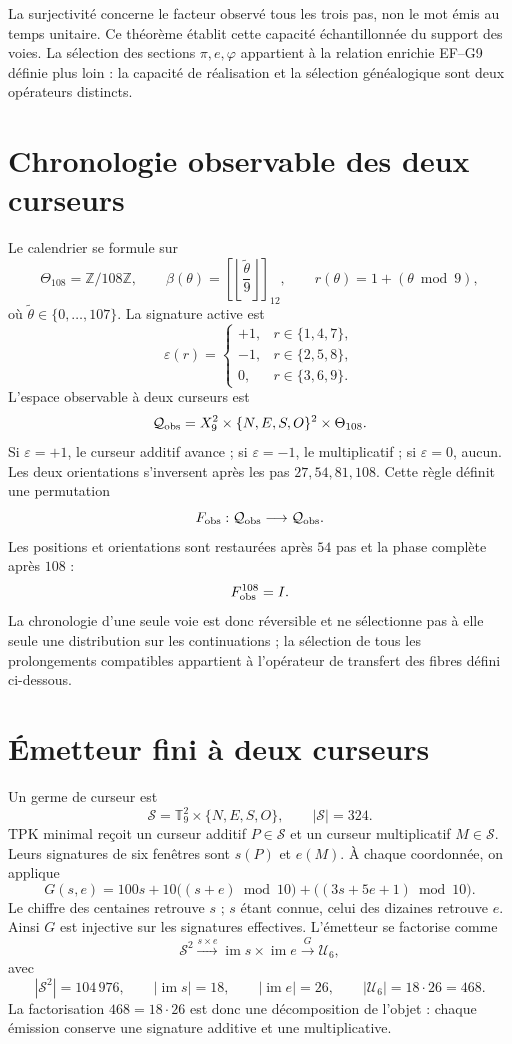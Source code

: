 La surjectivité concerne le facteur observé tous les trois pas, non le
mot émis au temps unitaire. Ce théorème établit cette capacité
échantillonnée du support des voies. La sélection des sections
\(\pi,e,\varphi\) appartient à la relation enrichie EF--G9 définie
plus loin : la capacité de réalisation et la sélection généalogique sont deux
opérateurs distincts.

\section{Chronologie observable des deux curseurs}

Le calendrier se formule sur
\[
 \Theta_{108}=\mathbb Z/108\mathbb Z,\qquad
 \beta(\theta)=
 \left[\left\lfloor\frac{\widetilde\theta}{9}\right\rfloor\right]_{12},
 \qquad
 r(\theta)=1+(\theta\bmod9),
\]
où \(\widetilde\theta\in\{0,\ldots,107\}\). La signature active est
\[
 \varepsilon(r)=
 \begin{cases}
 +1,&r\in\{1,4,7\},\\
 -1,&r\in\{2,5,8\},\\
 0,&r\in\{3,6,9\}.
 \end{cases}
\]
L'espace observable à deux curseurs est
\[
 \mathcal Q_{\rm obs}
 =X_9^2\times\{N,E,S,O\}^2\times\Theta_{108}.
\]
Si \(\varepsilon=+1\), le curseur additif avance ; si
\(\varepsilon=-1\), le multiplicatif ; si \(\varepsilon=0\), aucun.
Les deux orientations s'inversent après les pas
\(27,54,81,108\). Cette règle définit une permutation
\[
 F_{\rm obs}:\mathcal Q_{\rm obs}\longrightarrow\mathcal Q_{\rm obs}.
\]
Les positions et orientations sont restaurées après \(54\) pas et la phase
complète après \(108\) :
\[
 F_{\rm obs}^{108}=I.
\]
La chronologie d'une seule voie est donc réversible et ne sélectionne pas à elle
seule une distribution sur les continuations ; la sélection de tous les
prolongements compatibles appartient à l'opérateur de transfert des fibres
défini ci-dessous.

\section{Émetteur fini à deux curseurs}

Un germe de curseur est
\[
 \mathcal S=\mathbb T_9^2\times\{N,E,S,O\},
 \qquad |\mathcal S|=324.
\]
TPK minimal reçoit un curseur additif \(P\in\mathcal S\) et un curseur
multiplicatif \(M\in\mathcal S\). Leurs signatures de six fenêtres sont
\(s(P)\) et \(e(M)\). À chaque coordonnée, on applique
\[
 G(s,e)=100s+10\bigl((s+e)\bmod10\bigr)
       +\bigl((3s+5e+1)\bmod10\bigr).
\]
Le chiffre des centaines retrouve \(s\) ; \(s\) étant connue, celui des dizaines retrouve
\(e\). Ainsi \(G\) est injective sur les signatures effectives. L'émetteur
se factorise comme
\[
 \mathcal S^2\xrightarrow{s\times e}
 \operatorname{im}s\times\operatorname{im}e
 \xrightarrow{G}\mathcal U_6,
\]
avec
\[
 |\mathcal S^2|=104\,976,\qquad
 |\operatorname{im}s|=18,\qquad
 |\operatorname{im}e|=26,\qquad
 |\mathcal U_6|=18\cdot26=468.
\]
La factorisation \(468=18\cdot26\) est donc une décomposition de
l'objet : chaque émission conserve une signature additive et une multiplicative.

